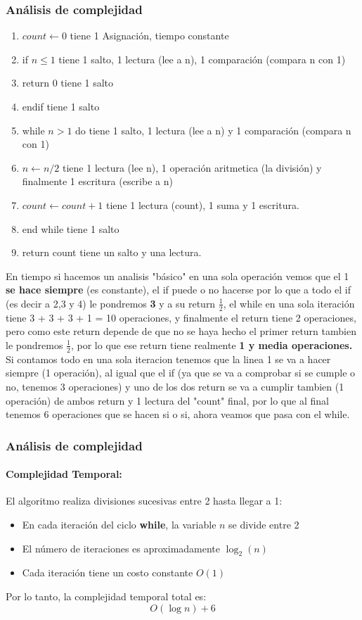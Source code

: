 \subsubsection*{Análisis de complejidad}
\begin{enumerate}
    \item $count \leftarrow 0$ tiene 1 Asignación, tiempo constante
    \item if $n \leq 1$ tiene 1 salto, 1 lectura (lee a n), 1 comparación (compara n con 1)
    \item return 0 tiene 1 salto 
    \item  endif tiene 1 salto
    \item while $n > 1$ do tiene 1 salto, 1 lectura (lee a n) y 1 comparación (compara n con 1)
    \item $n \gets n/2$ tiene 1 lectura (lee n), 1 operación aritmetica (la división) y finalmente 1 escritura (escribe a n)
    \item $count \gets count + 1$ tiene 1 lectura (count), 1 suma y 1 escritura.
    \item end while tiene 1 salto
    \item return count tiene un salto y una lectura.
\end{enumerate}
En tiempo si hacemos un analisis "básico" en una sola operación vemos que el 1 \textbf{se hace siempre} (es constante), el if puede o no hacerse por lo que a todo el if (es decir a 2,3 y 4) le pondremos \textbf{3} y a su return \textbf{$\frac{1}{2}$}, el while en una sola iteración tiene 3 + 3 + 3 + 1 = 10 operaciones, y finalmente el return tiene 2 operaciones, pero como este return depende de que no se haya hecho el primer return tambien le pondremos $\frac{1}{2}$, por lo que ese return tiene realmente \textbf{1 y media operaciones.} \\
Si contamos todo en una sola iteracion tenemos que la linea 1 se va a hacer siempre (1 operación), al igual que el if (ya que se va a comprobar si se cumple o no, tenemos 3 operaciones) y uno de los dos return se va a cumplir tambien (1 operación) de ambos return y 1 lectura del "count" final, por lo que al final tenemos 6 operaciones que se hacen si o si, ahora veamos que pasa con el while.

\subsubsection*{Análisis de complejidad}
\paragraph{Complejidad Temporal:}
El algoritmo realiza divisiones sucesivas entre 2 hasta llegar a 1:
\begin{itemize}
    \item En cada iteración del ciclo \textbf{while}, la variable $n$ se divide entre 2
    \item El número de iteraciones es aproximadamente $\log_2(n)$
    \item Cada iteración tiene un costo constante $O(1)$
\end{itemize}
Por lo tanto, la complejidad temporal total es:
\[
O(\log n) + 6
\]

